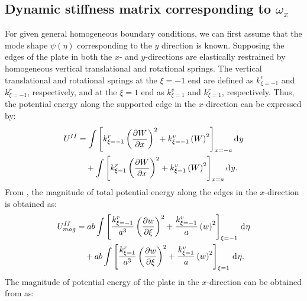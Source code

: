 \documentclass[preprint,12pt]{elsarticle}
\newcommand{\id}{\mathrm{d}\mkern1mu}
\begin{document}
\subsection{Dynamic stiffness matrix corresponding to $\omega_x$}\label{sec:DSMx}
For given general homogeneous boundary conditions, we can first assume that the mode shape $\psi(\eta)$ corresponding to the $y$ direction is known. 
Supposing the edges of the plate in both the \(x\)- and \(y\)-directions are elastically restrained by homogeneous vertical translational and rotational springs.
The vertical translational and rotational springs at the \(\xi = -1\) end are defined as \(k^v_{\xi = -1}\) and \(k^r_{\xi = -1}\), respectively, and at the \(\xi = 1\) end as \(k^v_{\xi = 1}\) and \(k^r_{\xi = 1}\), respectively. 
Thus, the potential energy along the supported edge in the \(x\)-direction can be expressed by:
%
\begin{equation}\label{eq:poten_energy_edgex}
	\begin{split}
		U^{II} &=  \int\left[k^r_{\xi=-1} \left( \frac{\partial W}{\partial x} \right)^2 + k^v_{\xi=-1} \left( W \right)^2\right]_{x=-a} \id y\\
		&\quad +  \int\left[k^r_{\xi=1} \left( \frac{\partial W}{\partial x} \right)^2 + k^v_{\xi=1} \left( W \right)^2\right]_{x=a} \id y.
	\end{split}
\end{equation}
%
From , the magnitude of total potential energy along the edges in the \(x\)-direction is obtained as:
%
\begin{equation}\label{eq:poten_energy_edgex2}
	\begin{split}
		U^{II}_{mag} &= ab \int\left[\frac{k^r_{\xi=-1}}{a^3} \left( \frac{\partial w}{\partial \xi} \right)^2 + \frac{k^v_{\xi=-1}}{a} \left( w \right)^2\right]_{\xi=-1} \, \id \eta \\
		&\quad + ab \int\left[\frac{k^r_{\xi=1}}{a^3} \left( \frac{\partial w}{\partial \xi} \right)^2 + \frac{k^v_{\xi=1}}{a} \left( w \right)^2\right]_{\xi=1} \, \id \eta.
	\end{split}
\end{equation}
%
The magnitude of potential energy of the plate in the \(x\)-direction can be obtained from  as:
%
\end{document}
